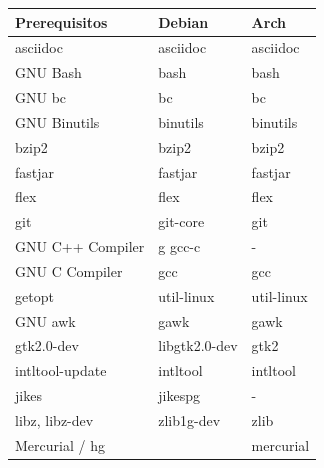 \documentclass{article}
\begin{document}
            \begin{tabular}{|l|l|l|}
                \hline
                \textbf{Prerequisitos}  & \textbf{Debian}   & \textbf{Arch}             \\           
                \hline
                asciidoc                & asciidoc          & asciidoc                  \\
                GNU Bash                & bash              & bash                      \\
                GNU bc                  & bc                & bc                        \\
                GNU Binutils            & binutils          & binutils                  \\
                bzip2                   & bzip2             & bzip2                     \\
                fastjar                 & fastjar           & fastjar                   \\
                flex                    & flex              & flex                      \\
                git                     & git-core          & git                       \\
                GNU C++ Compiler        & g gcc-c           & -                         \\
                GNU C Compiler          & gcc               & gcc                       \\
                getopt                  & util-linux        & util-linux                \\
                GNU awk                 & gawk              & gawk                      \\
                gtk2.0-dev              & libgtk2.0-dev     & gtk2                      \\
                intltool-update         & intltool          & intltool                  \\
                jikes                   & jikespg           & -                         \\
                libz, libz-dev          & zlib1g-dev        & zlib                      \\
                Mercurial / hg          &                   & mercurial                 \\

\end{tabular}
\end{document}
